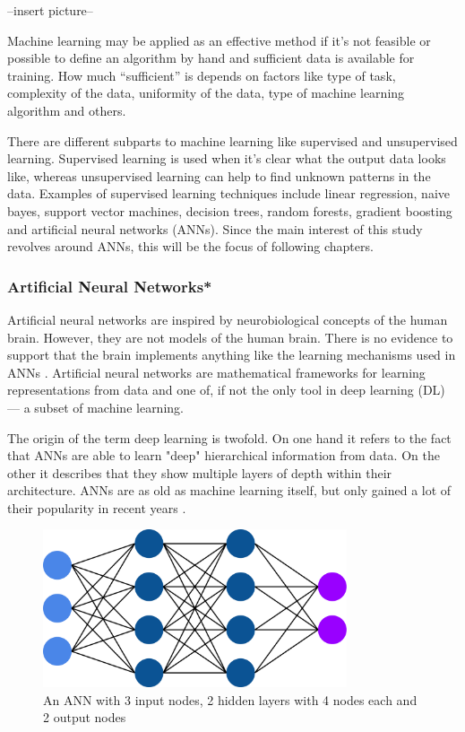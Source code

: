 --insert picture--

Machine learning may be applied as an effective method if it's not feasible or possible to define an algorithm by hand and sufficient data is available for training. How much “sufficient” is depends on factors like type of task, complexity of the data, uniformity of the data, type of machine learning algorithm and others.

There are different subparts to machine learning like supervised and unsupervised learning. Supervised learning is used when it's clear what the output data looks like, whereas unsupervised learning can help to find unknown patterns in the data. Examples of supervised learning techniques include linear regression, naive bayes, support vector machines, decision trees, random forests, gradient boosting and artificial neural networks (ANNs). Since the main interest of this study revolves around ANNs, this will be the focus of following chapters.

\subsubsection{Artificial Neural Networks*}

Artificial neural networks are inspired by neurobiological concepts of the human brain. However, they are not models of the human brain. There is no evidence to support that the brain implements anything like the learning mechanisms used in ANNs \cite{Chollet2017}. Artificial neural networks are mathematical frameworks for learning representations from data and one of, if not the only tool in deep learning (DL) --- a subset of machine learning.

The origin of the term deep learning is twofold. On one hand it refers to the fact that ANNs are able to learn "deep" hierarchical information from data. On the other it describes that they show multiple layers of depth within their architecture. ANNs are as old as machine learning itself, but only gained a lot of their popularity in recent years \cite{Chollet2017}.

\begin{figure}
\centering
\par
\includegraphics[width=0.8\textwidth]{imgs/ann.png}
\caption{An ANN with 3 input nodes, 2 hidden layers with 4 nodes each and 2 output nodes}
\par
\end{figure}

